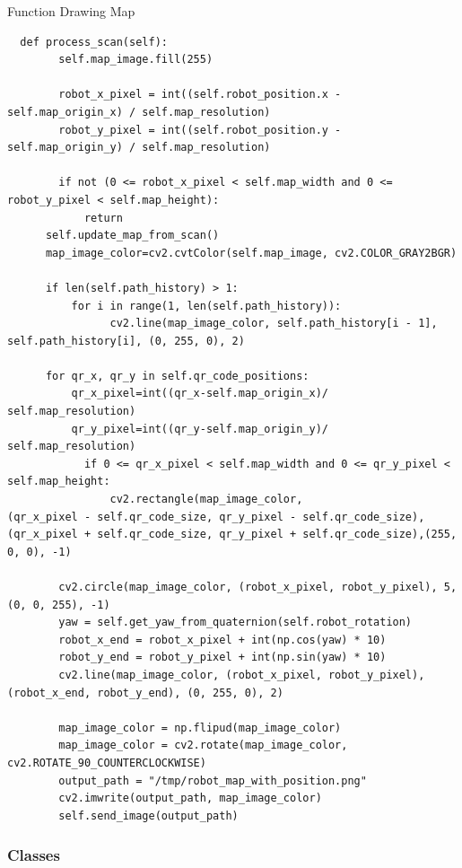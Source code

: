 \documentclass[../../main]{subfiles}
\begin{document}
\begin{codebox}[label=judeFig24]{Function Drawing Map}

  \begin{verbatim}
  def process_scan(self):
        self.map_image.fill(255)  

        robot_x_pixel = int((self.robot_position.x - self.map_origin_x) / self.map_resolution)
        robot_y_pixel = int((self.robot_position.y - self.map_origin_y) / self.map_resolution)

        if not (0 <= robot_x_pixel < self.map_width and 0 <= robot_y_pixel < self.map_height):
            return
      self.update_map_from_scan()
      map_image_color=cv2.cvtColor(self.map_image, cv2.COLOR_GRAY2BGR)

      if len(self.path_history) > 1:
          for i in range(1, len(self.path_history)):
                cv2.line(map_image_color, self.path_history[i - 1], self.path_history[i], (0, 255, 0), 2)

      for qr_x, qr_y in self.qr_code_positions:
          qr_x_pixel=int((qr_x-self.map_origin_x)/ self.map_resolution)
          qr_y_pixel=int((qr_y-self.map_origin_y)/ self.map_resolution)
            if 0 <= qr_x_pixel < self.map_width and 0 <= qr_y_pixel < self.map_height:
                cv2.rectangle(map_image_color,
(qr_x_pixel - self.qr_code_size, qr_y_pixel - self.qr_code_size),(qr_x_pixel + self.qr_code_size, qr_y_pixel + self.qr_code_size),(255, 0, 0), -1)

        cv2.circle(map_image_color, (robot_x_pixel, robot_y_pixel), 5, (0, 0, 255), -1)
        yaw = self.get_yaw_from_quaternion(self.robot_rotation)
        robot_x_end = robot_x_pixel + int(np.cos(yaw) * 10)
        robot_y_end = robot_y_pixel + int(np.sin(yaw) * 10)
        cv2.line(map_image_color, (robot_x_pixel, robot_y_pixel), (robot_x_end, robot_y_end), (0, 255, 0), 2)

        map_image_color = np.flipud(map_image_color)
        map_image_color = cv2.rotate(map_image_color, cv2.ROTATE_90_COUNTERCLOCKWISE)
        output_path = "/tmp/robot_map_with_position.png"
        cv2.imwrite(output_path, map_image_color)
        self.send_image(output_path)
\end{verbatim}
\end{codebox}
\subsubsection{Classes}
\end{document}
